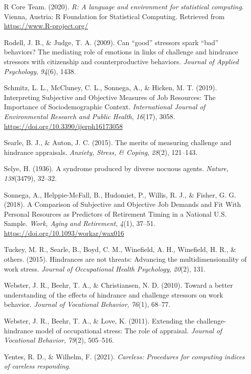\documentclass[
  english,
  man]{apa6}
\begin{document}
\leavevmode\hypertarget{ref-R-base}{}%
R Core Team. (2020). \emph{R: A language and environment for statistical computing}. Vienna, Austria: R Foundation for Statistical Computing. Retrieved from \url{https://www.R-project.org/}

\leavevmode\hypertarget{ref-rodell2009can}{}%
Rodell, J. B., \& Judge, T. A. (2009). Can ``good'' stressors spark ``bad'' behaviors? The mediating role of emotions in links of challenge and hindrance stressors with citizenship and counterproductive behaviors. \emph{Journal of Applied Psychology}, \emph{94}(6), 1438.

\leavevmode\hypertarget{ref-schmitz_interpreting_2019}{}%
Schmitz, L. L., McCluney, C. L., Sonnega, A., \& Hicken, M. T. (2019). Interpreting Subjective and Objective Measures of Job Resources: The Importance of Sociodemographic Context. \emph{International Journal of Environmental Research and Public Health}, \emph{16}(17), 3058. \url{https://doi.org/10.3390/ijerph16173058}

\leavevmode\hypertarget{ref-searle2015merits}{}%
Searle, B. J., \& Auton, J. C. (2015). The merits of measuring challenge and hindrance appraisals. \emph{Anxiety, Stress, \& Coping}, \emph{28}(2), 121--143.

\leavevmode\hypertarget{ref-selye1936syndrome}{}%
Selye, H. (1936). A syndrome produced by diverse nocuous agents. \emph{Nature}, \emph{138}(3479), 32--32.

\leavevmode\hypertarget{ref-sonnega_comparison_2018}{}%
Sonnega, A., Helppie-McFall, B., Hudomiet, P., Willis, R. J., \& Fisher, G. G. (2018). A Comparison of Subjective and Objective Job Demands and Fit With Personal Resources as Predictors of Retirement Timing in a National U.S. Sample. \emph{Work, Aging and Retirement}, \emph{4}(1), 37--51. \url{https://doi.org/10.1093/workar/wax016}

\leavevmode\hypertarget{ref-tuckey2015hindrances}{}%
Tuckey, M. R., Searle, B., Boyd, C. M., Winefield, A. H., Winefield, H. R., \& others. (2015). Hindrances are not threats: Advancing the multidimensionality of work stress. \emph{Journal of Occupational Health Psychology}, \emph{20}(2), 131.

\leavevmode\hypertarget{ref-webster2010toward}{}%
Webster, J. R., Beehr, T. A., \& Christiansen, N. D. (2010). Toward a better understanding of the effects of hindrance and challenge stressors on work behavior. \emph{Journal of Vocational Behavior}, \emph{76}(1), 68--77.

\leavevmode\hypertarget{ref-webster2011extending}{}%
Webster, J. R., Beehr, T. A., \& Love, K. (2011). Extending the challenge-hindrance model of occupational stress: The role of appraisal. \emph{Journal of Vocational Behavior}, \emph{79}(2), 505--516.

\leavevmode\hypertarget{ref-R-careless}{}%
Yentes, R. D., \& Wilhelm, F. (2021). \emph{Careless: Procedures for computing indices of careless responding}.

\endgroup
\end{document}
